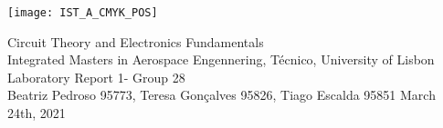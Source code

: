 
\thispagestyle {empty}

\texttt{[image: IST\_A\_CMYK\_POS]}

\begin{center}
%
\vspace{1.0cm}

\vspace{1cm}
{\FontLb Circuit Theory and Electronics Fundamentals} \\ %
\vspace{1cm}
{\FontSn Integrated Masters in Aerospace Engennering, Técnico, University of Lisbon} \\ %
\vspace{1cm}
{\FontSn Laboratory Report 1- Group 28} \\
\vspace{1cm}
{\FontSn Beatriz Pedroso 95773, Teresa Gonçalves 95826, Tiago Escalda 95851}
\vspace{1cm}
{\FontSn March 24th, 2021} \\ %
%
\end{center}

